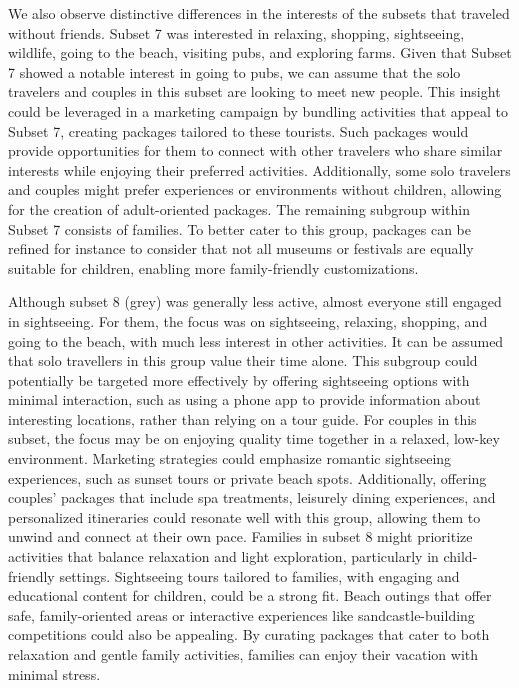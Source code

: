 \documentclass[article]{ajs}
\begin{document}
We also observe distinctive differences in the interests of the subsets that traveled without friends. Subset 7 was interested in relaxing, shopping, sightseeing, wildlife, going to the beach, visiting pubs, and exploring farms. Given that Subset 7 showed a notable interest in going to pubs, we can assume that the solo travelers and couples in this subset are looking to meet new people. This insight could be leveraged in a marketing campaign by bundling activities that appeal to Subset 7, creating packages tailored to these tourists. Such packages would provide opportunities for them to connect with other travelers who share similar interests while enjoying their preferred activities. Additionally, some solo travelers and couples might prefer experiences or environments without children, allowing for the creation of adult-oriented packages. The remaining subgroup within Subset 7 consists of families. To better cater to this group, packages can be refined for instance to consider that not all museums or festivals are equally suitable for children, enabling more family-friendly customizations.

Although subset 8 (grey) was generally less active, almost everyone still engaged in sightseeing. For them, the focus was on sightseeing, relaxing, shopping, and going to the beach, with much less interest in other activities. It can be assumed that solo travellers in this group value their time alone. This subgroup could potentially be targeted more effectively by offering sightseeing options with minimal interaction, such as using a phone app to provide information about interesting locations, rather than relying on a tour guide. For couples in this subset, the focus may be on enjoying quality time together in a relaxed, low-key environment. Marketing strategies could emphasize romantic sightseeing experiences, such as sunset tours or private beach spots. Additionally, offering couples' packages that include spa treatments, leisurely dining experiences, and personalized itineraries could resonate well with this group, allowing them to unwind and connect at their own pace. Families in subset 8 might prioritize activities that balance relaxation and light exploration, particularly in child-friendly settings. Sightseeing tours tailored to families, with engaging and educational content for children, could be a strong fit. Beach outings that offer safe, family-oriented areas or interactive experiences like sandcastle-building competitions could also be appealing. By curating packages that cater to both relaxation and gentle family activities, families can enjoy their vacation with minimal stress.
\end{document}
